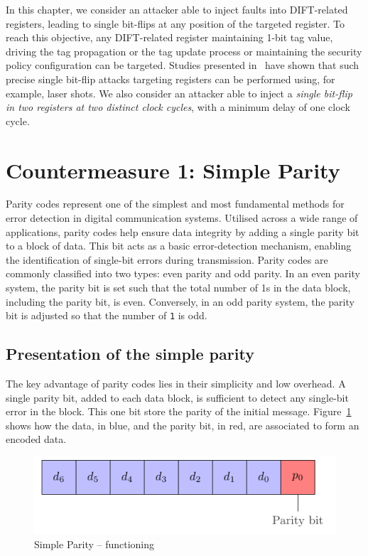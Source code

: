 In this chapter, we consider an attacker able to inject faults into DIFT-related registers, leading to single bit-flips at any position of the targeted register. To reach this objective, any DIFT-related register maintaining 1-bit tag value, driving the tag propagation or the tag update process or maintaining the security policy configuration can be targeted. Studies presented in~\cite{ZDCRT-12-dcis,CLFT-14-cosade} have shown that such precise single bit-flip attacks targeting registers can be performed using, for example, laser shots. We also consider an attacker able to inject a \textit{single bit-flip in two registers at two distinct clock cycles}, with a minimum delay of one clock cycle.

\section{Countermeasure 1: Simple Parity}
\label{chapter:simpleparity}

Parity codes represent one of the simplest and most fundamental methods for error detection in digital communication systems. Utilised across a wide range of applications, parity codes help ensure data integrity by adding a single parity bit to a block of data. This bit acts as a basic error-detection mechanism, enabling the identification of single-bit errors during transmission. Parity codes are commonly classified into two types: even parity and odd parity. In an even parity system, the parity bit is set such that the total number of 1s in the data block, including the parity bit, is even. Conversely, in an odd parity system, the parity bit is adjusted so that the number of \texttt{1} is odd.

\subsection{Presentation of the simple parity}
The key advantage of parity codes lies in their simplicity and low overhead. A single parity bit, added to each data block, is sufficient to detect any single-bit error in the block. This one bit store the parity of the initial message. Figure~\ref{fig:simpleparity_functionning} shows how the data, in blue, and the parity bit, in red, are associated to form an encoded data.

\begin{figure}[ht]
    \centering
    \includegraphics[page=1]{c5_countermeasures_dift/img/simple_parity.pdf}
    \caption{Simple Parity -- functioning}
    \label{fig:simpleparity_functionning}
\end{figure}


